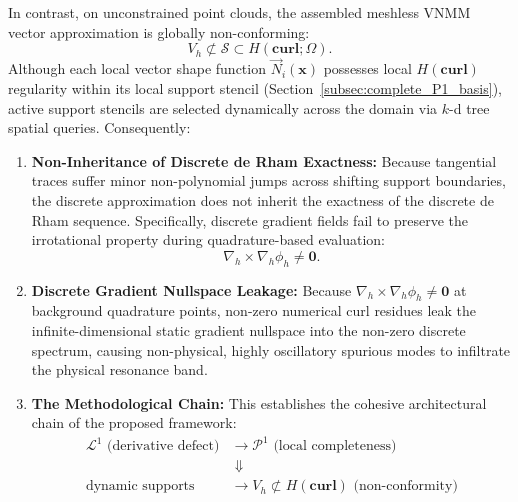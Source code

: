 \documentclass[preprint,12pt]{elsarticle}
\begin{document}
In contrast, on unconstrained point clouds, the assembled meshless VNMM vector approximation is globally non-conforming:
\begin{equation}
    V_h \not\subset \mathcal{S} \subset H(\mathbf{curl}; \Omega).
    \label{eq:nonconforming_space}
\end{equation}
Although each local vector shape function $\vec{N}_i(\mathbf{x})$ possesses local $H(\mathbf{curl})$ regularity within its local support stencil (Section~\ref{subsec:complete_P1_basis}), active support stencils are selected dynamically across the domain via $k$-d tree spatial queries. Consequently:
\begin{enumerate}
    \item \textbf{Non-Inheritance of Discrete de Rham Exactness:} Because tangential traces suffer minor non-polynomial jumps across shifting support boundaries, the discrete approximation does not inherit the exactness of the discrete de Rham sequence. Specifically, discrete gradient fields fail to preserve the irrotational property during quadrature-based evaluation:
          \begin{equation}
              \nabla_h \times \nabla_h \phi_h \neq \mathbf{0}.
              \label{eq:grad_curl_nonvanishing}
          \end{equation}
    \item \textbf{Discrete Gradient Nullspace Leakage:} Because $\nabla_h \times \nabla_h \phi_h \neq \mathbf{0}$ at background quadrature points, non-zero numerical curl residues leak the infinite-dimensional static gradient nullspace into the non-zero discrete spectrum, causing non-physical, highly oscillatory spurious modes to infiltrate the physical resonance band.
    \item \textbf{The Methodological Chain:} This establishes the cohesive architectural chain of the proposed framework:
          \begin{equation}
              \boxed{
                  \begin{aligned}
                      \mathcal{L}^1 \text{ (derivative defect)}        & \longrightarrow \mathcal{P}^1 \text{ (local completeness)}                \\
                                                                       & \;\Downarrow                                                              \\
                      \text{dynamic supports}                          & \longrightarrow V_h \not\subset H(\mathbf{curl}) \text{ (non-conformity)} \\

\end{aligned}}
\end{equation}
\end{enumerate}
\end{document}
